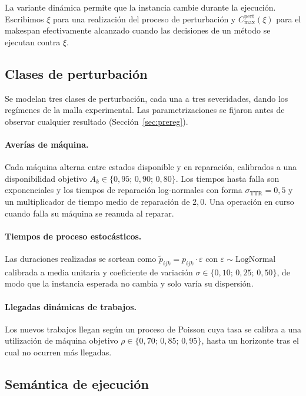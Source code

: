 \documentclass[a4paper,fleqn]{cas-sc}
\newcommand{\Cmax}{C_{\max}}
\begin{document}
La variante dinámica permite que la instancia cambie durante la ejecución.
Escribimos $\xi$ para una realización del proceso de perturbación y
$\Cmax^{\text{pert}}(\xi)$ para el makespan efectivamente alcanzado cuando las
decisiones de un método se ejecutan contra $\xi$.

\subsection{Clases de perturbación}\label{sec:disruption}

Se modelan tres clases de perturbación, cada una a tres severidades, dando los
\NRegimes{} regímenes de la malla experimental. Las parametrizaciones se fijaron
antes de observar cualquier resultado (Sección~\ref{sec:prereg}).

\paragraph{Averías de máquina.} Cada máquina alterna entre estados disponible y
en reparación, calibrados a una disponibilidad objetivo
$A_k\in\{0{,}95;\,0{,}90;\,0{,}80\}$. Los tiempos hasta falla son exponenciales
y los tiempos de reparación log-normales con forma
$\sigma_{\text{TTR}}=0{,}5$ y un multiplicador de tiempo medio de reparación de
$2{,}0$. Una operación en curso cuando falla su máquina se reanuda al reparar.

\paragraph{Tiempos de proceso estocásticos.} Las duraciones realizadas se
sortean como $\tilde{p}_{ijk}=p_{ijk}\cdot\varepsilon$ con
$\varepsilon\sim\mathrm{LogNormal}$ calibrada a media unitaria y coeficiente de
variación $\sigma\in\{0{,}10;\,0{,}25;\,0{,}50\}$, de modo que la instancia
esperada no cambia y solo varía su dispersión.

\paragraph{Llegadas dinámicas de trabajos.} Los nuevos trabajos llegan según un
proceso de Poisson cuya tasa se calibra a una utilización de máquina objetivo
$\rho\in\{0{,}70;\,0{,}85;\,0{,}95\}$, hasta un horizonte tras el cual no
ocurren más llegadas.

\subsection{Semántica de ejecución}\label{sec:execution}
\end{document}
